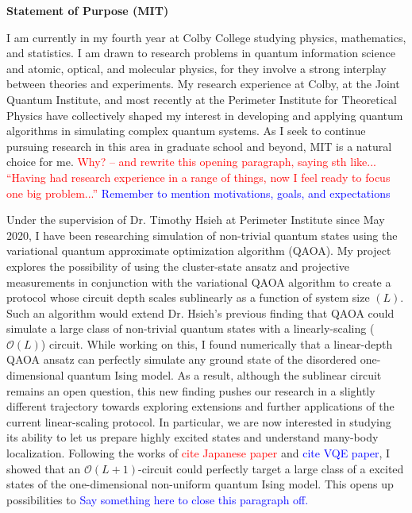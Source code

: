 \documentclass[12pt]{article}
\begin{document}
	
	
\begin{center}
	\textbf{Statement of Purpose (MIT)}
\end{center}	
I am currently in my fourth year at Colby College studying physics, mathematics, and statistics. I am drawn to research problems in quantum information science and atomic, optical, and molecular physics, for they involve a strong interplay between theories and experiments. My research experience at Colby, at the Joint Quantum Institute, and most recently at the Perimeter Institute for Theoretical Physics have collectively shaped my interest in developing and applying quantum algorithms in simulating complex quantum systems. As I seek to continue pursuing research in this area in graduate school and beyond, MIT is a natural choice for me. \textcolor{red}{Why? -- and rewrite this opening paragraph, saying sth like... ``Having had research experience in a range of things, now I feel ready to focus one big problem...''} \textcolor{blue}{Remember to mention motivations, goals, and expectations}\\ \vspace{-7pt}

Under the supervision of Dr. Timothy Hsieh at Perimeter Institute since May 2020, I have been researching simulation of non-trivial quantum states using the variational quantum approximate optimization algorithm (QAOA). My project explores the possibility of using the cluster-state ansatz and projective measurements in conjunction with the variational QAOA algorithm to create a protocol whose circuit depth scales sublinearly as a function of system size $(L)$. Such an algorithm would extend Dr. Hsieh's previous finding that QAOA could simulate a large class of non-trivial quantum states with a linearly-scaling ($\mathcal{O}(L)$) circuit. While working on this, I found numerically that a linear-depth QAOA ansatz can perfectly simulate any ground state of the disordered one-dimensional quantum Ising model. As a result, although the sublinear circuit remains an open question, this new finding pushes our research in a slightly different trajectory towards exploring extensions and further applications of the current linear-scaling protocol. In particular, we are now interested in studying its ability to let us prepare highly excited states and understand many-body localization. Following the works of \textcolor{red}{cite Japanese paper} and \textcolor{blue}{cite VQE paper}, I showed that an $\mathcal{O}(L+1)$-circuit could perfectly target a large class of a excited states of the one-dimensional non-uniform quantum Ising model. This opens up possibilities to \textcolor{blue}{Say something here to close this paragraph off.}\\ \vspace{-7pt}
\end{document}
